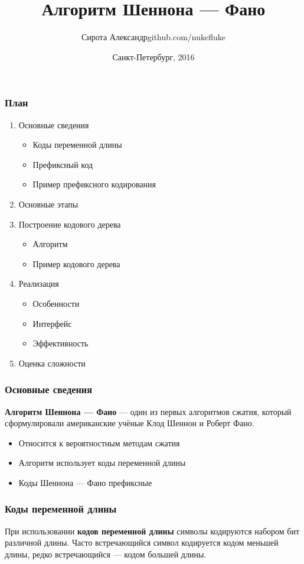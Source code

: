 \documentclass[10pt,pdf,hyperref={unicode}]{beamer}
\title{Алгоритм Шеннона --- Фано}
\author{Сирота Александр\newline\scriptsize github.com/nukefluke}
\institute{\normalsize{ГУАП} \\ \scriptsize{5 факультет \\ Группа 5511}}
\date[3pt]{\scriptsize{Санкт-Петербург, 2016}}
\begin{document}
\begin{frame}
	\titlepage
\end{frame}

\begin{frame}
	\frametitle{План}

	\begin{enumerate}
		\item Основные сведения
		\begin{itemize}
			\item Коды переменной длины
			\item Префиксный код
			\item Пример префиксного кодирования
		\end{itemize}
		\item Основные этапы
		\item Построение кодового дерева
		\begin{itemize}
			\item Алгоритм
			\item Пример кодового дерева
		\end{itemize}
		\item Реализация
		\begin{itemize}
			\item Особенности
			\item Интерфейс
			\item Эффективность
		\end{itemize}
		\item Оценка сложности
	\end{enumerate}
\end{frame}

\begin{frame}
	\frametitle{Основные сведения}
	\textbf{Алгоритм Шеннона --- Фано} --- один из первых алгоритмов 
	сжатия, который сформулировали американские учёные Клод Шеннон и Роберт 
	Фано.
	\begin{itemize}
		\item Относится к вероятностным методам сжатия
		\item Алгоритм использует коды переменной длины
		\item Коды Шеннона --- Фано префиксные
	\end{itemize}
\end{frame}

\begin{frame}
	\frametitle{Коды переменной длины}
	При использовании \textbf{кодов переменной длины} символы кодируются 
	набором бит различной длины.
	Часто встречающийся символ кодируется кодом меньшей длины, 
	редко встречающийся --- кодом большей длины.
\end{frame}
\end{document}
